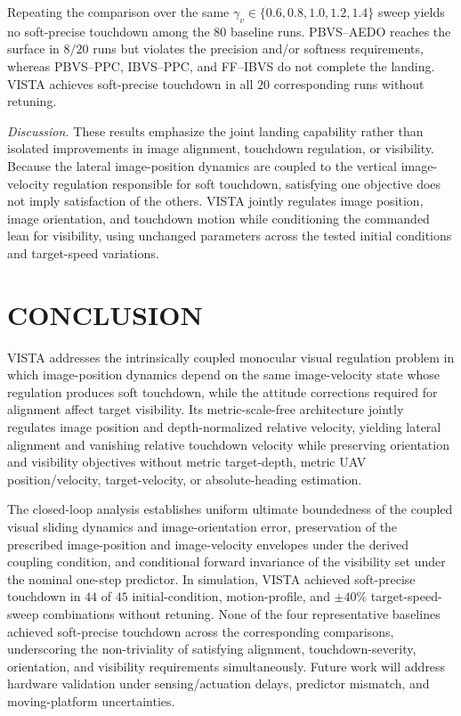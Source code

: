 \documentclass[10pt,conference]{IEEEtran}
\begin{document}
Repeating the comparison over the same $\gamma_v\in\{0.6,0.8,1.0,1.2,1.4\}$ sweep yields no soft-precise touchdown among the $80$ baseline runs. PBVS--AEDO reaches the surface in $8/20$ runs but violates the precision and/or softness requirements, whereas PBVS--PPC, IBVS--PPC, and FF--IBVS do not complete the landing. VISTA achieves soft-precise touchdown in all $20$ corresponding runs without retuning.

\noindent\textit{Discussion.}
These results emphasize the joint landing capability rather than isolated improvements in image alignment, touchdown regulation, or visibility. Because the lateral image-position dynamics are coupled to the vertical image-velocity regulation responsible for soft touchdown, satisfying one objective does not imply satisfaction of the others. VISTA jointly regulates image position, image orientation, and touchdown motion while conditioning the commanded lean for visibility, using unchanged parameters across the tested initial conditions and target-speed variations.

\section{CONCLUSION}
\label{sec:conclusion}

VISTA addresses the intrinsically coupled monocular visual regulation problem in which image-position dynamics depend on the same image-velocity state whose regulation produces soft touchdown, while the attitude corrections required for alignment affect target visibility. Its metric-scale-free architecture jointly regulates image position and depth-normalized relative velocity, yielding lateral alignment and vanishing relative touchdown velocity while preserving orientation and visibility objectives without metric target-depth, metric UAV position/velocity, target-velocity, or absolute-heading estimation.

The closed-loop analysis establishes uniform ultimate boundedness of the coupled visual sliding dynamics and image-orientation error, preservation of the prescribed image-position and image-velocity envelopes under the derived coupling condition, and conditional forward invariance of the visibility set under the nominal one-step predictor. In simulation, VISTA achieved soft-precise touchdown in $44$ of $45$ initial-condition, motion-profile, and $\pm40\%$ target-speed-sweep combinations without retuning. None of the four representative baselines achieved soft-precise touchdown across the corresponding comparisons, underscoring the non-triviality of satisfying alignment, touchdown-severity, orientation, and visibility requirements simultaneously. Future work will address hardware validation under sensing/actuation delays, predictor mismatch, and moving-platform uncertainties.



\end{document}

